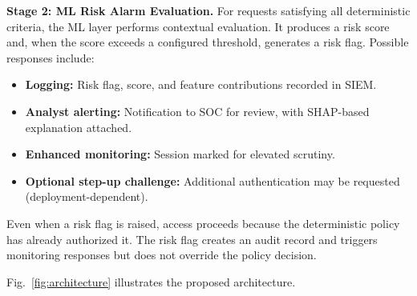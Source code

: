 \documentclass[conference]{IEEEtran}
\begin{document}
\textbf{Stage 2: ML Risk Alarm Evaluation.} For requests satisfying all deterministic criteria, the ML layer performs contextual evaluation. It produces a risk score and, when the score exceeds a configured threshold, generates a risk flag. Possible responses include:
\begin{itemize}
    \item \textbf{Logging:} Risk flag, score, and feature contributions recorded in SIEM.
    \item \textbf{Analyst alerting:} Notification to SOC for review, with SHAP-based explanation attached.
    \item \textbf{Enhanced monitoring:} Session marked for elevated scrutiny.
    \item \textbf{Optional step-up challenge:} Additional authentication may be requested (deployment-dependent).
\end{itemize}

Even when a risk flag is raised, access proceeds because the deterministic policy has already authorized it. The risk flag creates an audit record and triggers monitoring responses but does not override the policy decision.

Fig.~\ref{fig:architecture} illustrates the proposed architecture.
\end{document}
